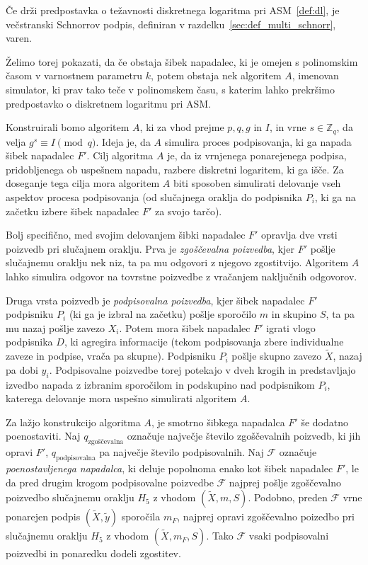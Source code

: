 \documentclass[isrm2, tisk]{fmfdelo}
\newcommand{\Z}{\mathbb Z}
\begin{document}
\begin{izrek}
    Če drži predpostavka o težavnosti diskretnega logaritma pri ASM~\ref{def:dl}, je večstranski 
    Schnorrov podpis, definiran v razdelku~\ref{sec:def_multi_schnorr}, varen.
\end{izrek}

Želimo torej pokazati, da če obstaja šibek napadalec, ki je omejen s polinomskim časom v varnostnem
parametru $k$, potem obstaja nek algoritem $A$, imenovan simulator, ki prav tako teče v polinomskem
času, s katerim lahko prekršimo predpostavko o diskretnem logaritmu pri ASM.

Konstruirali bomo algoritem $A$, ki za vhod prejme $p, q, g$ in $I$, in vrne $s \in \Z_q$,
da velja $g^s \equiv I \pmod q$. Ideja je, da $A$ simulira proces podpisovanja, ki ga napada šibek
napadalec $F'$. Cilj algoritma $A$ je, da iz vrnjenega ponarejenega podpisa, pridobljenega ob
uspešnem napadu, razbere diskretni logaritem, ki ga išče. Za doseganje tega cilja mora algoritem $A$
biti sposoben simulirati delovanje vseh aspektov procesa podpisovanja (od slučajnega oraklja do
podpisnika $P_i$, ki ga na začetku izbere šibek napadalec $F'$ za svojo tarčo).

Bolj specifično, med svojim delovanjem šibki napadalec $F'$ opravlja dve vrsti poizvedb pri slučajnem
oraklju. Prva je \textit{zgoščevalna poizvedba}, kjer $F'$ pošlje slučajnemu oraklju nek niz, ta pa
mu odgovori z njegovo zgostitvijo. Algoritem $A$ lahko simulira odgovor na tovrstne poizvedbe z vračanjem
naključnih odgovorov.

Druga vrsta poizvedb je \textit{podpisovalna poizvedba}, kjer šibek napadalec $F'$ podpisniku $P_i$
(ki ga je izbral na začetku) pošlje sporočilo $m$ in skupino $S$, ta pa mu nazaj pošlje zavezo $X_i$.
Potem mora šibek napadalec $F'$ igrati vlogo podpisnika $D$, ki agregira informacije (tekom podpisovanja
zbere individualne zaveze in podpise, vrača pa skupne). Podpisniku $P_i$ pošlje skupno zavezo
$\tilde{X}$, nazaj pa dobi $y_i$. Podpisovalne poizvedbe torej potekajo v dveh krogih in predstavljajo
izvedbo napada z izbranim sporočilom in podskupino nad podpisnikom $P_i$, katerega delovanje mora
uspešno simulirati algoritem $A$.

Za lažjo konstrukcijo algoritma $A$, je smotrno šibkega napadalca $F'$ še dodatno poenostaviti. Naj
$q_{\text{zgoščevalna}}$ označuje največje število zgoščevalnih poizvedb, ki jih opravi $F'$,
$q_{\text{podpisovalna}}$ pa največje število podpisovalnih. Naj $\mathcal{F}$ označuje
\textit{poenostavljenega napadalca}, ki deluje popolnoma enako kot šibek napadalec $F'$, le da pred
drugim krogom podpisovalne poizvedbe $\mathcal{F}$ najprej pošlje zgoščevalno poizvedbo slučajnemu
oraklju $H_5$ z vhodom $(\tilde{X}, m, S)$. Podobno, preden $\mathcal{F}$ vrne ponarejen podpis
$(\tilde{X}, \tilde{y})$ sporočila $m_F$, najprej opravi zgoščevalno poizedbo pri slučajnemu oraklju
$H_5$ z vhodom $(\tilde{X}, m_F, S)$. Tako $\mathcal{F}$ vsaki podpisovalni poizvedbi in ponaredku
dodeli zgostitev.
\end{document}
